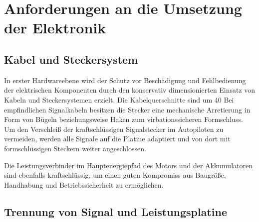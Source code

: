 \section{Anforderungen an die Umsetzung der Elektronik}

\subsection{Kabel und Steckersystem}

In erster Hardwareebene  wird der Schutz vor Beschädigung und Fehlbedienung der elektrischen Komponenten durch den konservativ dimensionierten Einsatz von Kabeln und Steckersystemen erzielt. Die Kabelquerschnitte sind um 40 %
Bei empfindlichen Signalkabeln besitzen die Stecker eine mechanische Arretierung  in Form von Bügeln beziehungsweise Haken zum virbationssicheren Formschluss.
Um den Verschleiß der kraftschlüssigen Signalstecker im Autopiloten zu vermeiden, werden alle Signale auf die Platine adaptiert und von dort mit formschlüssigen  Steckern weiter angeschlossen.

Die Leistungsverbinder im Hauptenergiepfad des Motors und der Akkumulatoren sind ebenfalls kraftschlüssig, um einen guten Kompromiss aus Baugröße, Handhabung und Betriebssicherheit zu ermöglichen.


\begin{comment}
In erster Hardwareebene  wird der Schutz vor Beschädigung und Fehlbedienung der elektrischen Komponenten durch konservativ dimensionierten Einsatz von Kabeln und Steckersystemen erzielt. Die Kabelquerschnitte sind um [Prozentzahl ?]
überdimensioniert. Bei den Steckverbindungen wird nach Möglichkeit eine einmalige Polanzahl des Verbinders gewählt.
Die Stecker besitzen bei empfindlichen Signalkabeln eine mechanische Arretierung durch virbationssicheren Formschluss in Form von Bügeln beziehungsweise Haken.
Um den Verschleiß der kraftschluss basierten Signalstecker im Autopiloten zu vermeiden, werden alle Signale auf die Platine adaptiert und von dort mit formschluss basierten Steckern weiter angeschlossen.

Die Leistungsverbinder im Hauptenergiepfad des Motors und der der Akkumulatoren sind kraftschlussbasiert, um einen Kompromiss aus Baugröße, Handhabung und Bertriebssicherheit zu erzielen.
\end{comment}


\subsection{Trennung von Signal und Leistungsplatine}

